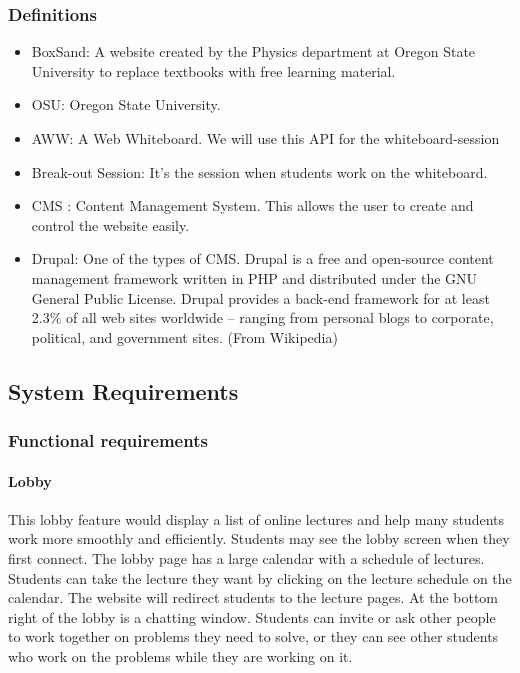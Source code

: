 \documentclass[10pt]{article}
\begin{document}
        \subsubsection{Definitions}
            \begin{itemize}
                \item BoxSand: A website created by the Physics department at Oregon State University to replace textbooks with free learning material.
                \item OSU: Oregon State University.
                \item AWW: A Web Whiteboard. We will use this API for the whiteboard-session
                \item Break-out Session: It’s the session when students work on the whiteboard.
                \item CMS : Content Management System. This allows the user to create and control the website easily.
                \item Drupal: One of the types of CMS. Drupal is a free and open-source content management framework written in PHP and distributed under the GNU General Public License. Drupal provides a back-end framework for at least 2.3\% of all web sites worldwide – ranging from personal blogs to corporate, political, and government sites. (From Wikipedia)
            \end{itemize}

    \subsection{System Requirements}
        \subsubsection{Functional requirements}
            \paragraph{Lobby}
                This lobby feature would display a list of online lectures and help many students work more smoothly and efficiently. Students may see the lobby screen when they first connect. The lobby page has a large calendar with a schedule of lectures. Students can take the lecture they want by clicking on the lecture schedule on the calendar. The website will redirect students to the lecture pages. At the bottom right of the lobby is a chatting window. Students can invite or ask other people to work together on problems they need to solve, or they can see other students who work on the problems while they are working on it.
\end{document}
